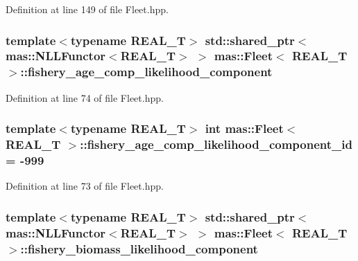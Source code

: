 Definition at line 149 of file Fleet.\-hpp.

\hypertarget{structmas_1_1_fleet_ae0e54dbe1514b3d5a33293b4250e0be4}{
\subsubsection[{fishery\-\_\-age\-\_\-comp\-\_\-likelihood\-\_\-component}]{\setlength{\rightskip}{0pt plus 5cm}template$<$typename R\-E\-A\-L\-\_\-\-T$>$ std\-::shared\-\_\-ptr$<${\bf mas\-::\-N\-L\-L\-Functor}$<$R\-E\-A\-L\-\_\-\-T$>$ $>$ {\bf mas\-::\-Fleet}$<$ R\-E\-A\-L\-\_\-\-T $>$\-::fishery\-\_\-age\-\_\-comp\-\_\-likelihood\-\_\-component}}\label{structmas_1_1_fleet_ae0e54dbe1514b3d5a33293b4250e0be4}


Definition at line 74 of file Fleet.\-hpp.

\hypertarget{structmas_1_1_fleet_aa87c827150245f5859ca47fc303eceb8}{
\subsubsection[{fishery\-\_\-age\-\_\-comp\-\_\-likelihood\-\_\-component\-\_\-id}]{\setlength{\rightskip}{0pt plus 5cm}template$<$typename R\-E\-A\-L\-\_\-\-T$>$ int {\bf mas\-::\-Fleet}$<$ R\-E\-A\-L\-\_\-\-T $>$\-::fishery\-\_\-age\-\_\-comp\-\_\-likelihood\-\_\-component\-\_\-id = -\/999}}\label{structmas_1_1_fleet_aa87c827150245f5859ca47fc303eceb8}


Definition at line 73 of file Fleet.\-hpp.

\hypertarget{structmas_1_1_fleet_abd3235a7cfd42c0106c59e8b51f4671d}{
\subsubsection[{fishery\-\_\-biomass\-\_\-likelihood\-\_\-component}]{\setlength{\rightskip}{0pt plus 5cm}template$<$typename R\-E\-A\-L\-\_\-\-T$>$ std\-::shared\-\_\-ptr$<${\bf mas\-::\-N\-L\-L\-Functor}$<$R\-E\-A\-L\-\_\-\-T$>$ $>$ {\bf mas\-::\-Fleet}$<$ R\-E\-A\-L\-\_\-\-T $>$\-::fishery\-\_\-biomass\-\_\-likelihood\-\_\-component}}\label{structmas_1_1_fleet_abd3235a7cfd42c0106c59e8b51f4671d}


